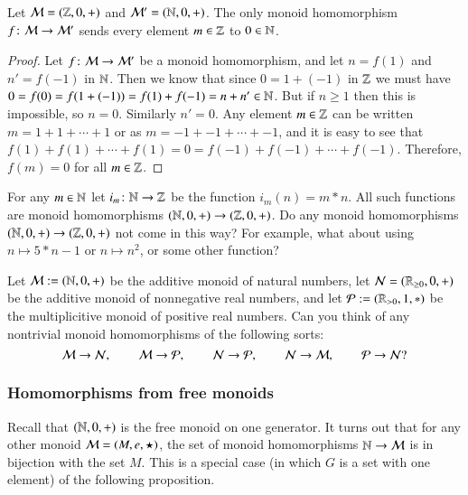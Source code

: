 \begin{proposition}\label{prop:int to nat trivial}

Let $\mathcal{M}=({\mathbb Z},0,+)$ and $\mathcal{M}'=({\mathbb N},0,+)$. The only monoid homomorphism $f\colon\mathcal{M}\rightarrow\mathcal{M}'$ sends every element $m\in{\mathbb Z}$ to $0\in{\mathbb N}$.

\end{proposition}

\begin{proof}

Let $f\colon\mathcal{M}\rightarrow\mathcal{M}'$ be a monoid homomorphism, and let $n=f(1)$ and $n'=f(-1)$ in ${\mathbb N}$. Then we know that since $0=1+(-1)$ in ${\mathbb Z}$ we must have $0=f(0)=f(1+(-1))=f(1)+f(-1)=n+n'\in{\mathbb N}$. But if $n\geq 1$ then this is impossible, so $n=0$. Similarly $n'=0$. Any element $m\in{\mathbb Z}$ can be written $m=1+1+\cdots+1$ or as $m=-1+-1+\cdots+-1$, and it is easy to see that $f(1)+f(1)+\cdots+f(1)=0=f(-1)+f(-1)+\cdots+f(-1)$. Therefore, $f(m)=0$ for all $m\in{\mathbb Z}$. 

\end{proof}

\begin{exercise}
For any $m\in{\mathbb N}$ let $i_m\colon{\mathbb N}\rightarrow{\mathbb Z}$ be the function $i_m(n)=m*n$. All such functions are monoid homomorphisms $({\mathbb N},0,+)\rightarrow({\mathbb Z},0,+)$. Do any monoid homomorphisms $({\mathbb N},0,+)\rightarrow({\mathbb Z},0,+)$ not come in this way? For example, what about using $n\mapsto 5*n-1$ or $n\mapsto n^2$, or some other function? 
\end{exercise}

\begin{exercise}
Let $\mathcal{M}:=({\mathbb N},0,+)$ be the additive monoid of natural numbers, let $\mathcal{N}=({\mathbb R}_{\geq0},0,+)$ be the additive monoid of nonnegative real numbers, and let $\mathcal{P}:=({\mathbb R}_{>0},1,*)$ be the multiplicitive monoid of positive real numbers. Can you think of any nontrivial monoid homomorphisms of the following sorts: $$\mathcal{M}\rightarrow\mathcal{N},\hspace{.3in}\mathcal{M}\rightarrow\mathcal{P},\hspace{.3in}\mathcal{N}\rightarrow\mathcal{P},\hspace{.3in} \mathcal{N}\rightarrow\mathcal{M},\hspace{.3in}\mathcal{P}\rightarrow\mathcal{N}?$$
\end{exercise}



\subsubsection{Homomorphisms from free monoids}

Recall that $({\mathbb N},0,+)$ is the free monoid on one generator. It turns out that for any other monoid $\mathcal{M}=(M,e,\star)$, the set of monoid homomorphisms ${\mathbb N}\rightarrow\mathcal{M}$ is in bijection with the set $M$. This is a special case (in which $G$ is a set with one element) of the following proposition.

